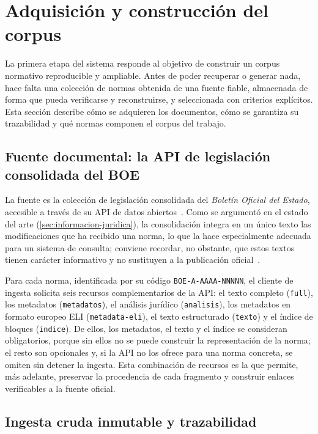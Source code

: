 \section{Adquisición y construcción del corpus}
\label{sec:corpus}

La primera etapa del sistema responde al objetivo de construir un corpus normativo reproducible y ampliable. Antes de poder recuperar o generar nada, hace falta una colección de normas obtenida de una fuente fiable, almacenada de forma que pueda verificarse y reconstruirse, y seleccionada con criterios explícitos. Esta sección describe cómo se adquieren los documentos, cómo se garantiza su trazabilidad y qué normas componen el corpus del trabajo.

\subsection{Fuente documental: la API de legislación consolidada del BOE}
\label{subsec:fuente-api}

La fuente es la colección de legislación consolidada del \emph{Boletín Oficial del Estado}, accesible a través de su API de datos abiertos~\cite{boeApiConsolidada}. Como se argumentó en el estado del arte (\ref{sec:informacion-juridica}), la consolidación integra en un único texto las modificaciones que ha recibido una norma, lo que la hace especialmente adecuada para un sistema de consulta; conviene recordar, no obstante, que estos textos tienen carácter informativo y no sustituyen a la publicación oficial~\cite{boeLegislacionActualizada}.

Para cada norma, identificada por su código \texttt{BOE-A-AAAA-NNNNN}, el cliente de ingesta solicita seis recursos complementarios de la API: el texto completo (\texttt{full}), los metadatos (\texttt{metadatos}), el análisis jurídico (\texttt{analisis}), los metadatos en formato europeo ELI (\texttt{metadata-eli}), el texto estructurado (\texttt{texto}) y el índice de bloques (\texttt{indice}). De ellos, los metadatos, el texto y el índice se consideran obligatorios, porque sin ellos no se puede construir la representación de la norma; el resto son opcionales y, si la API no los ofrece para una norma concreta, se omiten sin detener la ingesta. Esta combinación de recursos es la que permite, más adelante, preservar la procedencia de cada fragmento y construir enlaces verificables a la fuente oficial.

\subsection{Ingesta cruda inmutable y trazabilidad}
\label{subsec:ingesta-cruda}

